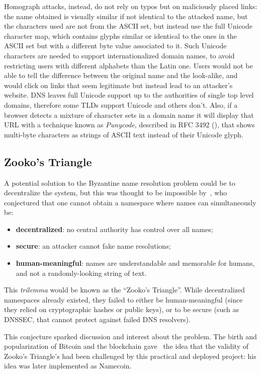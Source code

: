\documentclass[mscthesis]{usiinfthesis}
\begin{document}
Homograph attacks, instead, do not rely on typos but on maliciously placed links: the name obtained is visually similar if not identical to the attacked name, but the characters used are not from the ASCII set, but instead use the full Unicode character map, which contains glyphs similar or identical to the ones in the ASCII set but with a different byte value associated to it. Such Unicode characters are needed to support internationalized domain names, to avoid restricting users with different alphabets than the Latin one. Users would not be able to tell the difference between the original name and the look-alike, and would click on links that seem legitimate but instead lead to an attacker's website. DNS leaves full Unicode support up to the authorities of single top level domains, therefore some TLDs support Unicode and others don't. Also, if a browser detects a mixture of character sets in a domain name it will display that URL with a technique known as \emph{Punycode}, described in RFC 3492 (\cite{rfc:3492}), that shows multi-byte characters as strings of ASCII text instead of their Unicode glyph. 

\subsection{Zooko's Triangle}

A potential solution to the Byzantine name resolution problem could be to decentralize the system, but this was thought to be impossible by~\cite{wilcox2003names}, who conjectured that one cannot obtain a namespace where names can simultaneously be:
\begin{itemize}
	\item \textbf{decentralized}: no central authority has control over all names;
	\item \textbf{secure}: an attacker cannot fake name resolutions;
	\item \textbf{human-meaningful}: names are understandable and memorable for humans, and not a randomly-looking string of text.
\end{itemize}

This \textit{trilemma} would be known as the ``Zooko's Triangle''. While decentralized namespaces already existed, they failed to either be human-meaningful (since they relied on cryptographic hashes or public keys), or to be secure (such as DNSSEC, that cannot protect against failed DNS resolvers).

This conjecture sparked discussion and interest about the problem. The birth and popularization of Bitcoin and the blockchain gave~\cite{swartz2011names} the idea that the validity of Zooko's Triangle's had been challenged by this practical and deployed project: his idea was later implemented as Namecoin.
\end{document}
